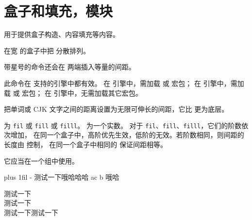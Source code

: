 \documentclass{cusdoc}
\begin{document}
\section{盒子和填充，模块}

 用于提供盒子构造、内容填充等内容。

\begin{function}{\spreadtext}
  \begin{syntax}
    \V\spreadtext   {} 
    \V\spreadtext *  
  \end{syntax}
在宽  的盒子中把  分散排列。

带星号的命令还会在  两端插入等量的间距。

此命令在 \CusLaTeX 支持的引擎中都有效。
在 \LuaLaTeX 引擎中，需加载  或  宏包；
在 \XeLaTeX 引擎中，需加载  或  宏包；
在 \upLaTeX 引擎中，无需加载其它宏包。
\end{function}

\begin{xample}

\stopxamplecode
\xampleprint
\end{xample}

\begin{function}{\useinfiniteskip}
  \begin{syntax}
    \V\useinfiniteskip {}
  \end{syntax}
把单词或 CJK 文字之间的距离设置为无限可伸长的间距，它比  更为底层。

 为 \texttt{fil} 或 \texttt{fill}
或 \texttt{filll}。 为一个实数。
对于 \texttt{fil}、\texttt{fill}、\texttt{filll}，它们的阶数依次增加，
在同一个盒子中，高阶优先生效，低阶的无效。若阶数相同，则间距的长度由  控制，
在同一个盒子中相同的  保证间距相等。

它应当在一个组中使用。
\end{function}

\begin{xample}
\parbox{8\ccwd}{%
   plus 1fil \parfillskip-\rightskip
  测试一下哦哈哈哈 ac b 哦哈}%
\quad
\parbox{5\ccwd}{%
  测试一下\\测试一下\\测试一下测试一下}
\stopxamplecode
\xampleprint
\end{xample}
\end{document}
